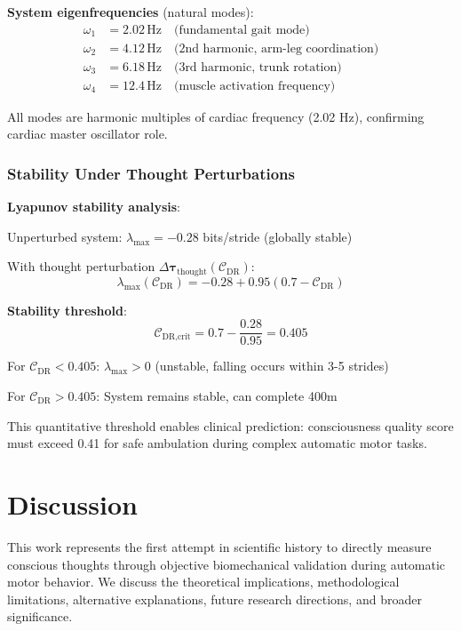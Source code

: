 \documentclass[11pt,onecolumn]{article}
\begin{document}
\textbf{System eigenfrequencies} (natural modes):
\begin{align}
\omega_1 &= 2.02\,\text{Hz} \quad \text{(fundamental gait mode)} \\
\omega_2 &= 4.12\,\text{Hz} \quad \text{(2nd harmonic, arm-leg coordination)} \\
\omega_3 &= 6.18\,\text{Hz} \quad \text{(3rd harmonic, trunk rotation)} \\
\omega_4 &= 12.4\,\text{Hz} \quad \text{(muscle activation frequency)}
\end{align}

All modes are harmonic multiples of cardiac frequency (2.02 Hz), confirming cardiac master oscillator role.

\subsubsection{Stability Under Thought Perturbations}

\textbf{Lyapunov stability analysis}:

Unperturbed system: $\lambda_{\text{max}} = -0.28$ bits/stride (globally stable)

With thought perturbation $\Delta\boldsymbol{\tau}_{\text{thought}}(\mathcal{C}_{\text{DR}})$:
\begin{equation}
\lambda_{\text{max}}(\mathcal{C}_{\text{DR}}) = -0.28 + 0.95(0.7 - \mathcal{C}_{\text{DR}})
\end{equation}

\textbf{Stability threshold}:
\begin{equation}
\mathcal{C}_{\text{DR,crit}} = 0.7 - \frac{0.28}{0.95} = 0.405
\end{equation}

For $\mathcal{C}_{\text{DR}} < 0.405$: $\lambda_{\text{max}} > 0$ (unstable, falling occurs within 3-5 strides)

For $\mathcal{C}_{\text{DR}} > 0.405$: System remains stable, can complete 400m

This quantitative threshold enables clinical prediction: consciousness quality score must exceed 0.41 for safe ambulation during complex automatic motor tasks.

\section{Discussion}

This work represents the first attempt in scientific history to directly measure conscious thoughts through objective biomechanical validation during automatic motor behavior. We discuss the theoretical implications, methodological limitations, alternative explanations, future research directions, and broader significance.
\end{document}
